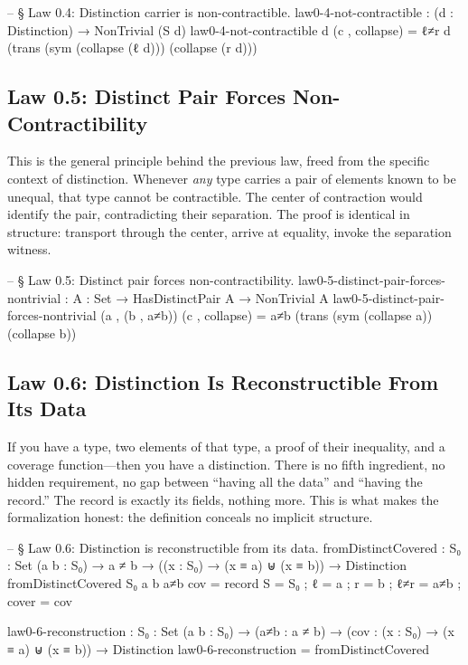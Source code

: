 \documentclass[11pt,a4paper]{book}
\begin{document}
\begin{code}
-- § Law 0.4: Distinction carrier is non-contractible.
law0-4-not-contractible : (d : Distinction) → NonTrivial (S d)
law0-4-not-contractible d (c , collapse) =
  ℓ≠r d (trans (sym (collapse (ℓ d))) (collapse (r d)))
\end{code}

\subsection{Law 0.5: Distinct Pair Forces Non-Contractibility}

This is the general principle behind the previous law, freed from the specific context of distinction. Whenever \textit{any} type carries a pair of elements known to be unequal, that type cannot be contractible. The center of contraction would identify the pair, contradicting their separation. The proof is identical in structure: transport through the center, arrive at equality, invoke the separation witness.

\begin{code}
-- § Law 0.5: Distinct pair forces non-contractibility.
law0-5-distinct-pair-forces-nontrivial :
  {A : Set} → HasDistinctPair A → NonTrivial A
law0-5-distinct-pair-forces-nontrivial (a , (b , a≠b)) (c , collapse) =
  a≠b (trans (sym (collapse a)) (collapse b))
\end{code}

\subsection{Law 0.6: Distinction Is Reconstructible From Its Data}

If you have a type, two elements of that type, a proof of their inequality, and a coverage function—then you have a distinction. There is no fifth ingredient, no hidden requirement, no gap between ``having all the data'' and ``having the record.'' The record is exactly its fields, nothing more. This is what makes the formalization honest: the definition conceals no implicit structure.

\begin{code}
-- § Law 0.6: Distinction is reconstructible from its data.
fromDistinctCovered :
  {S₀ : Set} (a b : S₀) →
  a ≠ b →
  ((x : S₀) → (x ≡ a) ⊎ (x ≡ b)) →
  Distinction
fromDistinctCovered {S₀} a b a≠b cov = record
  { S = S₀ ; ℓ = a ; r = b ; ℓ≠r = a≠b ; cover = cov }

law0-6-reconstruction :
  {S₀ : Set} (a b : S₀) →
  (a≠b : a ≠ b) →
  (cov : (x : S₀) → (x ≡ a) ⊎ (x ≡ b)) →
  Distinction
law0-6-reconstruction = fromDistinctCovered
\end{code}
\end{document}

